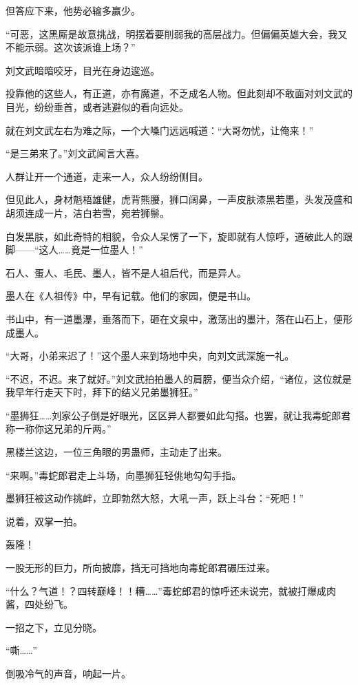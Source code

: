 \begin{this_body}
但答应下来，他势必输多赢少。

“可恶，这黑厮是故意挑战，明摆着要削弱我的高层战力。但偏偏英雄大会，我又不能示弱。这次该派谁上场？”

刘文武暗暗咬牙，目光在身边逡巡。

投靠他的这些人，有正道，亦有魔道，不乏成名人物。但此刻却不敢面对刘文武的目光，纷纷垂首，或者逃避似的看向远处。

就在刘文武左右为难之际，一个大嗓门远远喊道：“大哥勿忧，让俺来！”

“是三弟来了。”刘文武闻言大喜。

人群让开一个通道，走来一人，众人纷纷侧目。

但见此人，身材魁梧雄健，虎背熊腰，狮口阔鼻，一声皮肤漆黑若墨，头发茂盛和胡须连成一片，洁白若雪，宛若狮鬃。

白发黑肤，如此奇特的相貌，令众人呆愣了一下，旋即就有人惊呼，道破此人的跟脚——“这人……竟是一位墨人！”

石人、蛋人、毛民、墨人，皆不是人祖后代，而是异人。

墨人在《人祖传》中，早有记载。他们的家园，便是书山。

书山中，有一道墨瀑，垂落而下，砸在文泉中，激荡出的墨汁，落在山石上，便形成墨人。

“大哥，小弟来迟了！”这个墨人来到场地中央，向刘文武深施一礼。

“不迟，不迟。来了就好。”刘文武拍拍墨人的肩膀，便当众介绍，“诸位，这位就是我早年行走天下时，拜下的结义兄弟墨狮狂。”

“墨狮狂……刘家公子倒是好眼光，区区异人都要如此勾搭。也罢，就让我毒蛇郎君称一称你这兄弟的斤两。”

黑楼兰这边，一位三角眼的男蛊师，主动走了出来。

“来啊。”毒蛇郎君走上斗场，向墨狮狂轻佻地勾勾手指。

墨狮狂被这动作挑衅，立即勃然大怒，大吼一声，跃上斗台：“死吧！”

说着，双掌一拍。

轰隆！

一股无形的巨力，所向披靡，挡无可挡地向毒蛇郎君碾压过来。

“什么？气道！？四转巅峰！！糟……”毒蛇郎君的惊呼还未说完，就被打爆成肉酱，四处纷飞。

一招之下，立见分晓。

“嘶……”

倒吸冷气的声音，响起一片。

\end{this_body}

